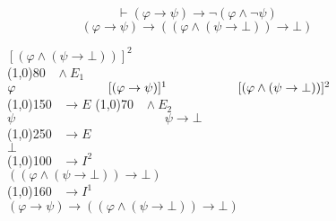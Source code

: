 \documentclass{article}
\theoremstyle{break}
\theoremstyle{break}
\theoremstyle{break}
\theoremstyle{break}
\begin{document}
\begin{figure}[H]
    \begin{exercise}[a casa]
        \[
            \vdash (\varphi \to \psi) \to \neg (\varphi \wedge \neg \psi)
        \] 
        \[
            (\varphi \to \psi) \to ((\varphi \wedge (\psi \to \bot)) \to \bot)
        \] 
        \begin{center}
            \hspace{-8cm}\( [(\varphi \wedge (\psi \to \bot))]^2 \) \\
            \hspace{-7cm}\line(1,0){80}\(\;\;\; \wedge E_1 \) \hspace{4cm}\\
            \hspace{1cm}\( \varphi \hspace{2.6cm}[(\varphi \to \psi)]^1 \hspace{1cm} \hspace{1cm} [(\varphi \wedge (\psi \to \bot))]^2\) \\
            \hspace{0.7cm}\line(1,0){150}\(\;\;\; \to E \) \hspace{0.8cm}\line(1,0){70}\(\;\;\; \wedge E_2 \)\\
            \hspace{2cm}\( \psi \hspace{5cm} \psi \to \bot\)\\ 
            \hspace{1cm}\line(1,0){250}\(\;\;\; \to E\)\\
            \( \bot \) \\
            \hspace{1cm}\line(1,0){100}\(\;\;\; \to I^2 \)\\
            \( ((\varphi \wedge (\psi \to \bot)) \to \bot) \) \\
            \hspace{1cm}\line(1,0){160}\(\;\;\; \to I^1 \)\\
            \( (\varphi \to \psi) \to ((\varphi \wedge (\psi \to \bot)) \to \bot) \)
        \end{center}
    \end{exercise}
\end{figure}
\end{document}
